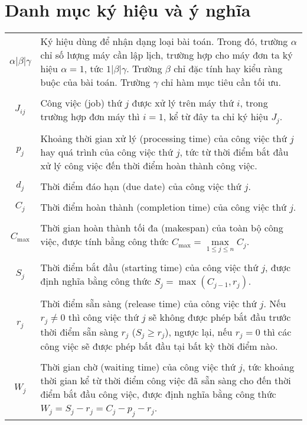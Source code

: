\documentclass[12pt,a4paper]{report}
\begin{document}
	\chapter*{Danh mục ký hiệu và ý nghĩa}
	\thispagestyle{fancy}
	\begin{tabularx}{\linewidth}{ c  X }
		$\alpha | \beta | \gamma$ & Ký hiệu dùng để nhận dạng loại bài toán. Trong đó, trường $\alpha$ chỉ số lượng máy cần lập lịch, trường hợp cho máy đơn ta ký hiệu $\alpha = 1$, tức $1| \beta | \gamma$. Trường $\beta$ chỉ đặc tính hay kiểu ràng buộc của bài toán. Trường $\gamma$ chỉ hàm mục tiêu cần tối ưu. \\
		\\
		$J_{ij}$ & Công việc (job) thứ $j$ được xử lý trên máy thứ $i$, trong trường hợp đơn máy thì $i=1$, kể từ đây ta chỉ ký hiệu $J_j$. \\
		\\
		$p_j$ & Khoảng thời gian xử lý (processing time) của công việc thứ $j$ hay quá trình của công việc thứ $j$, tức từ thời điểm bắt đầu xử lý công việc đến thời điểm hoàn thành công việc. \\
		\\
		$d_j$ & Thời điểm đáo hạn (due date) của công việc thứ $j$. \\
		\\
		$C_j$ & Thời điểm hoàn thành (completion time) của công việc thứ $j$. \\
		\\
		$C_{\max}$ & Thời gian hoàn thành tối đa (makespan) của toàn bộ công việc, được tính bằng công thức $C_{\max} = \underset{1 \leq j \leq n}{\max} C_j$. \\
		\\
		$S_j$ & Thời điểm bắt đầu (starting time) của công việc thứ $j$, được định nghĩa bằng công thức $S_j = \max (C_{j-1}, r_j)$. \\
		\\
		$r_j$ & Thời điểm sẵn sàng (release time) của công việc thứ $j$. Nếu $r_j \neq 0$ thì công việc thứ $j$ sẽ không được phép bắt đầu trước thời điểm sẵn sàng $r_j$ ($S_j \geq r_j$), ngược lại, nếu $r_j = 0$ thì các công việc sẽ được phép bất đầu tại bất kỳ thời điểm nào. \\
		\\
		$W_j$ & Thời gian chờ (waiting time) của công việc thứ $j$, tức khoảng thời gian kể từ thời điểm công việc đã sẵn sàng cho đến thời điểm bắt đầu công việc, được định nghĩa bằng công thức $W_j = S_j - r_j = C_j - p_j - r_j$. \\

\end{tabularx}
\end{document}
